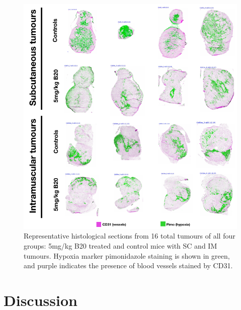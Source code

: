 \begin{figure}[htbp]
   \centering
   \includegraphics[width=\textwidth]{oemri_thesis3/oemri_thesis3-images/5_oep8_imsc_histo.png} %
   \caption{Representative histological sections from 16 total tumours of all four groups: 5mg/kg B20 treated and control mice with \acs{SC} and \acs{IM} tumours.
   Hypoxia marker pimonidazole staining is shown in green, and purple indicates the presence of blood vessels stained by CD31.}
   \label{allHisto}
\end{figure}

\section{Discussion}

